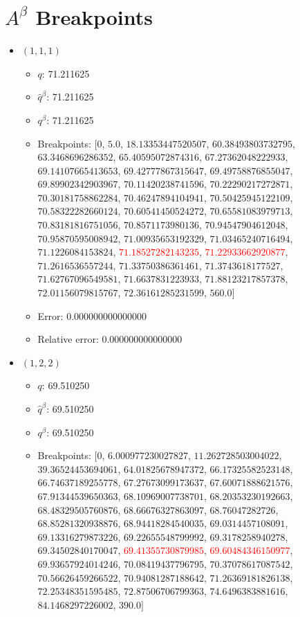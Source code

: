 \documentclass{article}%
\begin{document}
\section{$A^\beta$ Breakpoints}%
\thispagestyle{plain}%
\begin{itemize}%
	\item $(1, 1, 1)$%
	\begin{itemize}%
		\item $q$: 71.211625%
		\item $\hat{q}^\beta$: 71.211625%
		\item $q^\beta$: 71.211625%
		\item Breakpoints: $[$$0$, $5.0$, $18.13353447520507$, $60.38493803732795$, $63.3468696286352$, $65.40595072874316$, $67.27362048222933$, $69.14107665413653$, $69.42777867315647$, $69.49758876855047$, $69.89902342903967$, $70.11420238741596$, $70.22290217272871$, $70.30181758862284$, $70.46247894104941$, $70.50425945122109$, $70.58322282660124$, $70.60541450524272$, $70.65581083979713$, $70.83181816751056$, $70.8571173980136$, $70.94547904612048$, $70.95870595008942$, $71.00935653192329$, $71.03465240716494$, $71.1226084153824$, \textcolor{red}{$71.18527282143235$}, \textcolor{red}{$71.22933662920877$}, $71.2616536557244$, $71.33750386361461$, $71.3743618177527$, $71.62767096549581$, $71.6637831223933$, $71.88123217857378$, $72.01156079815767$, $72.36161285231599$, $560.0$$]$%
		\item Error: 0.000000000000000%
		\item Relative error: 0.000000000000000%
	\end{itemize}%
	\item $(1, 2, 2)$%
	\begin{itemize}%
		\item $q$: 69.510250%
		\item $\hat{q}^\beta$: 69.510250%
		\item $q^\beta$: 69.510250%
		\item Breakpoints: $[$$0$, $6.000977230027827$, $11.262728503004022$, $39.36524453694061$, $64.01825678947372$, $66.17325582523148$, $66.74637189255778$, $67.27673099173637$, $67.60071888621576$, $67.91344539650363$, $68.10969007738701$, $68.20353230192663$, $68.48329505760876$, $68.66676327863097$, $68.76047282726$, $68.85281320938876$, $68.94418284540035$, $69.0314457108091$, $69.13316279873226$, $69.22655548799992$, $69.3178258940278$, $69.34502840170047$, \textcolor{red}{$69.41355730879985$}, \textcolor{red}{$69.60484346150977$}, $69.93657924014246$, $70.08419437796795$, $70.37078617087542$, $70.56626459266522$, $70.94081287188642$, $71.26369181826138$, $72.25348351595485$, $72.87506706799363$, $74.6496383881616$, $84.1468297226002$, $390.0$$]$%

\end{itemize}
\end{itemize}
\end{document}
